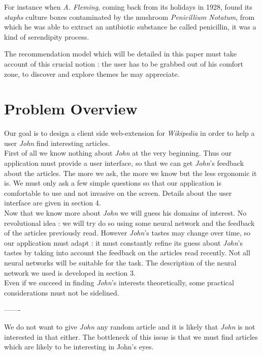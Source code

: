 \documentclass[11pt]{article}
\theoremstyle{plain}
\theoremstyle{definition}
\theoremstyle{remark}
\begin{document}
For instance when \textit{A. Fleming}, coming back from its holidays in 1928, found its \textit{staphs} culture boxes contaminated by the mushroom \textit{Penicillium Notatum}, from which he was able to extract an antibiotic substance he called penicillin, it was a kind of serendipity process.

The recommendation model which will be detailed in this paper must take account of this crucial notion : the user has to be grabbed out of his comfort zone, to discover and explore themes he may appreciate.

\section{Problem Overview}

Our goal is to design a client side web-extension for \textit{Wikipedia} in order to help a user \textit{John} find interesting articles. \\

First of all we know nothing about \textit{John} at the very beginning. Thus our application must provide a user interface, so that we can get \textit{John}'s feedback about the articles. The more we ask, the more we know but the less ergonomic it is. We must only ask  a few simple questions so that our application is comfortable to use and not invasive on the screen. Details about the user interface are given in section 4. \\

Now that we know more about \textit{John} we will guess his domains of interest. No revolutional idea : we will try do so using some neural network and the feedback of the articles previously read. However \textit{John}'s tastes may change over time, so our application must adapt : it must constantly refine its guess about \textit{John}'s tastes by taking into account the feedback on the articles read recently. Not all neural networks will be suitable for the task. The description of the neural network we used is developed in section 3. \\

Even if we succeed in finding \textit{John}'s interests theoretically, some practical considerations must not be sidelined.

-------

We do not want to give \textit{John} any random article and it is likely that \textit{John} is not interested in that either. The bottleneck of this issue is that we must find articles which are likely to be interesting in John's eyes.
\end{document}
